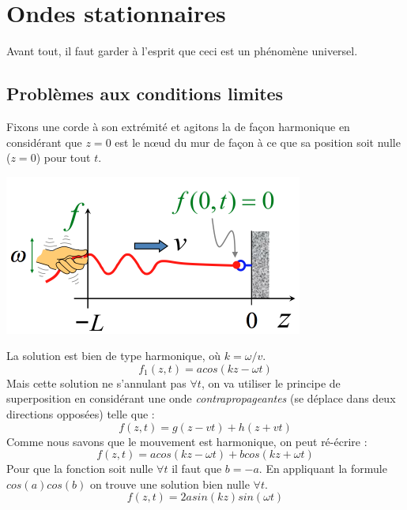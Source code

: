 \documentclass	[11pt, a4paper, openany]{book}
\begin{document}
		\section{Ondes stationnaires}
		Avant tout, il faut garder à l'esprit que ceci est un phénomène universel.
		
		\subsection{Problèmes aux conditions limites}
		Fixons une corde à son extrémité et agitons la de façon harmonique en considérant que $z = 0$ est le nœud du mur de façon à ce que sa position soit nulle ($z = 0$) pour tout $t$.
		\begin{center}
			\includegraphics[scale=0.4]{oo/image37.png}
		\end{center}
		La solution est bien de type harmonique, où $k = \omega / v$.
		\begin{equation}
			f_1(z, t) = a cos(kz - \omega t)
		\end{equation}
		Mais cette solution ne s'annulant pas $\forall t$, on va utiliser le principe de superposition en considérant une onde \textit{contrapropageantes} (se déplace dans deux directions opposées) telle que :
		\begin{equation}
			f(z, t) = g(z - vt) + h(z +vt)
		\end{equation}
		Comme nous savons que le mouvement est harmonique, on peut ré-écrire : 
		\begin{equation}
			f(z,t) = a cos(kz - \omega t) + b cos(kz + \omega t)
		\end{equation}
		Pour que la fonction soit nulle $\forall t$ il faut que $b = -a$. En appliquant la formule $cos(a)cos(b)$ on trouve une solution bien nulle $\forall t$. 
		\begin{equation}
			f(z, t) = 2a sin(kz)sin(\omega t)
		\end{equation}
		
\end{document}
